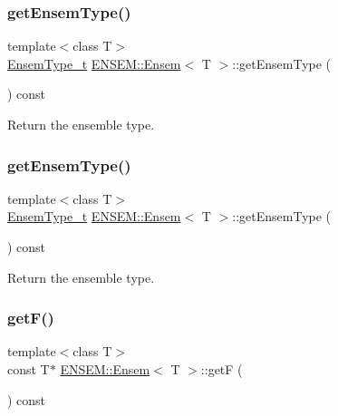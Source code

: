 \subsubsection{\texorpdfstring{getEnsemType()}{getEnsemType()}\hspace{0.1cm}{\footnotesize\ttfamily [2/3]}}
{\footnotesize\ttfamily template$<$class T$>$ \\
\mbox{\hyperlink{namespaceENSEM_a2dc2c4a26884f343471e52f23479ddbe}{Ensem\+Type\+\_\+t}} \mbox{\hyperlink{classENSEM_1_1Ensem}{E\+N\+S\+E\+M\+::\+Ensem}}$<$ T $>$\+::get\+Ensem\+Type (\begin{DoxyParamCaption}{ }\end{DoxyParamCaption}) const\hspace{0.3cm}{\ttfamily [inline]}}



Return the ensemble type. 

\mbox{\label{classENSEM_1_1Ensem_aa2cfc665852c06f9b058a1a2233d249e}} 
\subsubsection{\texorpdfstring{getEnsemType()}{getEnsemType()}\hspace{0.1cm}{\footnotesize\ttfamily [3/3]}}
{\footnotesize\ttfamily template$<$class T$>$ \\
\mbox{\hyperlink{namespaceENSEM_a2dc2c4a26884f343471e52f23479ddbe}{Ensem\+Type\+\_\+t}} \mbox{\hyperlink{classENSEM_1_1Ensem}{E\+N\+S\+E\+M\+::\+Ensem}}$<$ T $>$\+::get\+Ensem\+Type (\begin{DoxyParamCaption}{ }\end{DoxyParamCaption}) const\hspace{0.3cm}{\ttfamily [inline]}}



Return the ensemble type. 

\mbox{\label{classENSEM_1_1Ensem_ad2cb7a34934bedeaa29f49c78cdb8371}} 
\subsubsection{\texorpdfstring{getF()}{getF()}\hspace{0.1cm}{\footnotesize\ttfamily [1/6]}}
{\footnotesize\ttfamily template$<$class T$>$ \\
const T$\ast$ \mbox{\hyperlink{classENSEM_1_1Ensem}{E\+N\+S\+E\+M\+::\+Ensem}}$<$ T $>$\+::getF (\begin{DoxyParamCaption}{ }\end{DoxyParamCaption}) const\hspace{0.3cm}{\ttfamily [inline]}}



